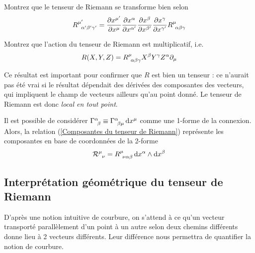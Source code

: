 \begin{exerc}
    Montrez que le tenseur de Riemann se transforme bien selon
    \begin{equation}
        R\indices{^{\mu '}_{\!\!\alpha ' \beta ' \gamma'}} = \frac{\partial x^{\mu '}}{\partial x^{\mu} }\frac{\partial x^{\alpha}}{\partial x^{\alpha '} }\frac{\partial x^{\beta}}{\partial x^{\beta '} }\frac{\partial x^{\gamma}}{\partial x^{\gamma '} }R\indices{^{\mu}_{\!\alpha \beta \gamma}}
    \end{equation}
\end{exerc}
\begin{exerc}
    Montrez que l'action du tenseur de Riemann est multiplicatif, i.e.
    \begin{equation}
        R(X,Y,Z) = R\indices{^\mu _\!_\alpha_\beta_\gamma} X^\beta Y^\gamma Z^\alpha \pd_\mu
    \end{equation}
\end{exerc}
Ce résultat est important pour confirmer que $R$ est bien un tenseur : ce n'aurait pas été vrai si le résultat dépendait des dérivées des composantes des vecteurs, qui impliquent le champ de vecteurs ailleurs qu'au point donné. Le tenseur de Riemann est donc \emph{local en tout point}.
\begin{rmk}
    Il est possible de considérer $\Gamma\indices{^\alpha_{\!\beta}} \equiv \Gamma\indices{^\alpha_{\!\beta \mu}}\, \td x^\mu$ comme une 1-forme de la connexion. Alors, la relation (\ref{Composantes du tenseur de Riemann}) représente les composantes en base de coordonnées de la 2-forme 
    \begin{equation}
        \mathcal{R}\indices{^\mu_\nu} = R\indices{^\mu_\!_\nu_\alpha_\beta}\, \td x^\alpha \wedge \td x^\beta
    \end{equation}
    
\end{rmk}
\subsection{Interprétation géométrique du tenseur de Riemann}

D'après une notion intuitive de courbure, on s'attend à ce qu'un vecteur transporté parallèlement d'un point à un autre selon deux chemins différents donne lieu à 2 vecteurs différents. Leur différence nous permettra de quantifier la notion de courbure.  

